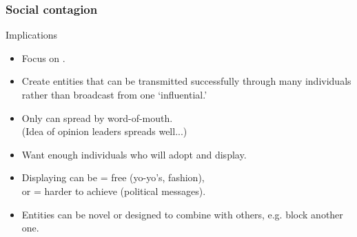 \begin{frame}
  \frametitle{Social contagion}

  \begin{block}{Implications}
  \begin{itemize}
  \item<1->
    Focus on .
  \item<2->
    Create entities that can be transmitted successfully
    through many individuals rather than broadcast from one `influential.'
  \item<3->
    Only  can spread by word-of-mouth.\\
    \qquad (Idea of opinion leaders spreads well...)
  \item<4->
    Want enough individuals who will adopt and display.
  \item<5->
    Displaying can be  = free (yo-yo's, fashion),\\
    or  = harder to achieve (political messages).
  \item<6->
    Entities can be novel or designed to combine with others,
    e.g. block another one.
  \end{itemize}
  \end{block}

\end{frame}






